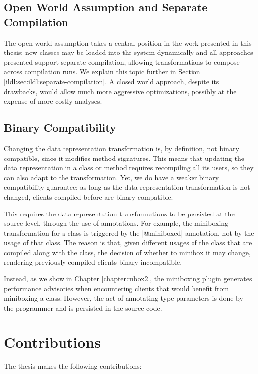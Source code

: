 \subsection{Open World Assumption and Separate Compilation}

The open world assumption takes a central position in the work presented in this thesis: new classes may be loaded into the system dynamically and all approaches presented support separate compilation, allowing transformations to compose across compilation runs. We explain this topic further in Section \ref{ildl:sec:ildl:separate-compilation}. A closed world approach, despite its drawbacks, would allow much more aggressive optimizations, possibly at the expense of more costly analyses.

\subsection{Binary Compatibility}

Changing the data representation transformation is, by definition, not binary compatible, since it modifies method signatures. This means that updating the data representation in a class or method requires recompiling all its users, so they can also adapt to the transformation. Yet, we do have a weaker binary compatibility guarantee: as long as the data representation transformation is not changed, clients compiled before are binary compatible.

This requires the data representation transformations to be persisted at the source level, through the use of annotations. For example, the miniboxing transformation for a class is triggered by the |@miniboxed| annotation, not by the usage of that class. The reason is that, given different usages of the class that are compiled along with the class, the decision of whether to minibox it may change, rendering previously compiled clients binary incompatible.

Instead, as we show in Chapter \ref{chapter:mbox2}, the miniboxing plugin generates performance advisories when encountering clients that would benefit from miniboxing a class. However, the act of annotating type parameters is done by the programmer and is persisted in the source code.

\section{Contributions}

The thesis makes the following contributions:

